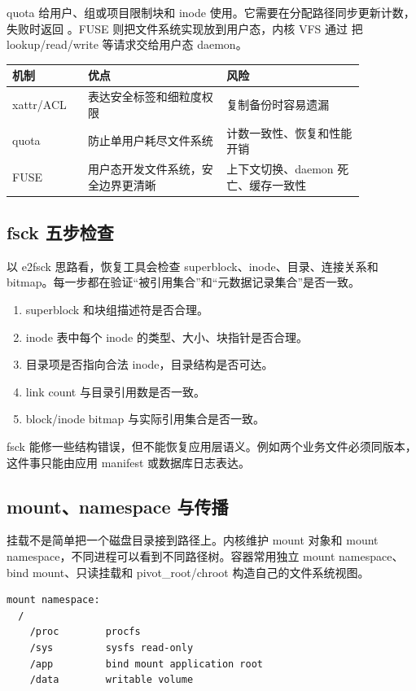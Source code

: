 quota 给用户、组或项目限制块和 inode 使用。它需要在分配路径同步更新计数，失败时返回 。FUSE 则把文件系统实现放到用户态，内核 VFS 通过  把 lookup/read/write 等请求交给用户态 daemon。

\begin{longtable}{p{0.18\linewidth}p{0.34\linewidth}p{0.34\linewidth}}
\toprule
机制 & 优点 & 风险 \\
\midrule
xattr/ACL & 表达安全标签和细粒度权限 & 复制备份时容易遗漏 \\
quota & 防止单用户耗尽文件系统 & 计数一致性、恢复和性能开销 \\
FUSE & 用户态开发文件系统，安全边界更清晰 & 上下文切换、daemon 死亡、缓存一致性 \\
\bottomrule
\end{longtable}

\subsection{fsck 五步检查}

以 e2fsck 思路看，恢复工具会检查 superblock、inode、目录、连接关系和 bitmap。每一步都在验证“被引用集合”和“元数据记录集合”是否一致。

\begin{enumerate}
\tightlist
\item superblock 和块组描述符是否合理。
\item inode 表中每个 inode 的类型、大小、块指针是否合理。
\item 目录项是否指向合法 inode，目录结构是否可达。
\item link count 与目录引用数是否一致。
\item block/inode bitmap 与实际引用集合是否一致。
\end{enumerate}

fsck 能修一些结构错误，但不能恢复应用层语义。例如两个业务文件必须同版本，这件事只能由应用 manifest 或数据库日志表达。

\subsection{mount、namespace 与传播}

挂载不是简单把一个磁盘目录接到路径上。内核维护 mount 对象和 mount namespace，不同进程可以看到不同路径树。容器常用独立 mount namespace、bind mount、只读挂载和 pivot\_root/chroot 构造自己的文件系统视图。

\begin{lstlisting}
mount namespace:
  /
    /proc        procfs
    /sys         sysfs read-only
    /app         bind mount application root
    /data        writable volume
\end{lstlisting}

